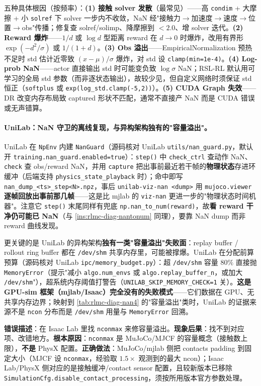 五种具体根因（按频率）：\textbf{(1) 接触 solver 发散}（最常见）——高 \verb|condim| + 大摩擦 + 小 \verb|solref| 下 solver 一步内不收敛，NaN 经"接触力$\to$加速度$\to$速度$\to$位置$\to$obs"传播；修复查 solref/solimp、降摩擦到 $<2.0$、增 solver 迭代。\textbf{(2) Reward 爆炸}——$1/d$ 或 $\log d$ 型距离 reward 在 $d\to 0$ 时爆炸，改用有界形 $\exp(-d^2/\sigma)$ 或 $1/(1+d)$。\textbf{(3) Obs 溢出}——EmpiricalNormalization 预热不足时 std 估计近零致 $(x-\mu)/\sigma$ 爆炸，对 std 设 \verb|clamp(min=1e-4)|。\textbf{(4) Log-prob NaN}——actor 直接输出 std 时可能变负致 $\log\sigma$ NaN；RSL-RL 默认用可学习的全局 std 参数（而非逐状态输出），故较少见，但自定义网络时须保证 std 恒正（\verb|softplus| 或 \verb|exp(log_std.clamp(-5,2))|）。\textbf{(5) CUDA Graph 失效}——DR 改变内存布局致 captured 形状不匹配，通常不直接产 NaN 而是 CUDA 错误或无声错算。

\paragraph{UniLab：NaN 守卫的离线复现，与异构架构独有的"容量溢出"。}UniLab 在 \verb|NpEnv| 内建 \verb|NanGuard|（源码核对 UniLab \verb|utils/nan_guard.py|，默认开 \verb|training.nan_guard.enabled=true|）：\verb|step()| 中 \verb|check_ctrl| 查动作 NaN、\verb|check| 查 obs/reward NaN，并用 \verb|capture| 把出事前最近若干帧的\textbf{物理状态}存进环缓冲（后端支持 \verb|physics_state_playback| 时）；命中即写 \verb|nan_dump_<ts>_step<N>.npz|，事后 \verb|unilab-viz-nan <dump>| 用 \verb|mujoco.viewer| \textbf{逐帧回放出事前那几帧}——这是比 mjlab 的 \verb|viz-nan| 更进一步的"物理状态时间机器"。注意它 \verb|step()| 末尾同样有兜底 \verb|np.nan_to_num(reward)|，故\textbf{看 reward 干净仍可能已 NaN}（与 \cref{ins:rlmc-diag-nantonum} 同理），要靠 NaN dump 而非 reward 曲线发现。

更关键的是 UniLab 的异构架构\textbf{独有一类"容量溢出"失败面}：replay buffer / rollout ring buffer 都在 \verb|/dev/shm| 共享内存里，可能被撑爆。UniLab 在分配前算预算（源码核对 UniLab \verb|ipc/memory_budget.py|）：超 \verb|/dev/shm| 容量 $80\%$ 直接抛 \verb|MemoryError|（提示"减小 \verb|algo.num_envs| 或 \verb|algo.replay_buffer_n|，或加大 \verb|/dev/shm|"），超系统内存阈值打警告（\verb|UNILAB_SKIP_MEMORY_CHECK=1| 关）。\textbf{这是 GPU-sim 框架（mjlab/Isaac）完全没有的失败模式}——它们数据在 GPU、无共享内存边界；映射到 \cref{tab:rlmc-diag-nan4} 的"容量溢出"类时，UniLab 的证据来源不是 \verb|ncon| 分布而是 \verb|/dev/shm| 用量与 \verb|MemoryError| 回溯。

\begin{pitfall}
\textbf{错误描述}：在 Isaac Lab 里找 \verb|nconmax| 来修容量溢出。\textbf{现象后果}：找不到对应项、改错地方。\textbf{根本原因}：\verb|nconmax| 是 MuJoCo/MJCF 的容量概念（接触数上限），\textbf{不是} PhysX 配置。\textbf{正确做法}：MuJoCo/mjlab 侧把 contacts padding 到固定大小（MJCF 设 \verb|nconmax|，经验取 $1.5\times$ 观测到的最大 ncon）；Isaac Lab/PhysX 侧对应的是接触缓冲/contact sensor 配置，且较新版本已移除 \verb|SimulationCfg.disable_contact_processing|，须按所用版本官方参数处理。
\end{pitfall}

